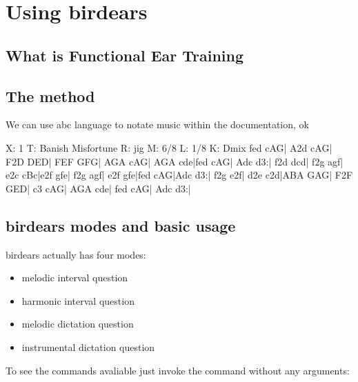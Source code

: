 \documentclass[letterpaper,10pt,english]{sphinxmanual}
\begin{document}
\chapter{Using birdears}
\label{\detokenize{index:using-birdears}}

\section{What is Functional Ear Training}
\label{\detokenize{index:what-is-functional-ear-training}}
\sphinxAtStartPar
{}


\section{The method}
\label{\detokenize{index:the-method}}
\sphinxAtStartPar
We can use abc language to notate music within the documentation, ok

\begin{sphinxVerbatim}[commandchars=\\\{\}]
X: 1
T: Banish Misfortune
R: jig
M: 6/8
L: 1/8
K: Dmix
fed cAG| A2d cAG| F2D DED| FEF GFG|
AGA cAG| AGA cde|fed cAG| Ad\PYGZca{}c d3:|
f2d d\PYGZca{}cd| f2g agf| e2c cBc|e2f gfe|
f2g agf| e2f gfe|fed cAG|Ad\PYGZca{}c d3:|
f2g e2f| d2e c2d|ABA GAG| F2F GED|
c3 cAG| AGA cde| fed cAG| Ad\PYGZca{}c d3:|
\end{sphinxVerbatim}


\section{birdears modes and basic usage}
\label{\detokenize{index:birdears-modes-and-basic-usage}}
\sphinxAtStartPar
birdears actually has four modes:
\begin{itemize}
\item {} 
\sphinxAtStartPar
melodic interval question

\item {} 
\sphinxAtStartPar
harmonic interval question

\item {} 
\sphinxAtStartPar
melodic dictation question

\item {} 
\sphinxAtStartPar
instrumental dictation question

\end{itemize}

\sphinxAtStartPar
To see the commands avaliable just invoke the command without any arguments:
\end{document}
